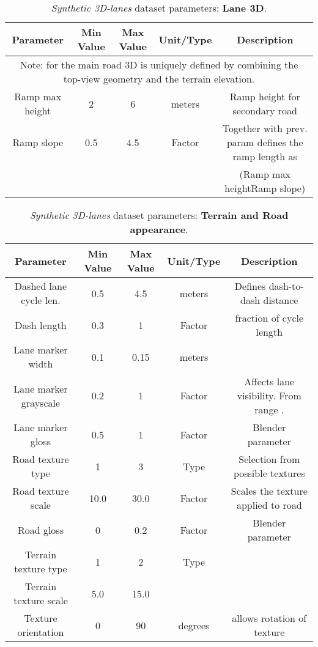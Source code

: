 \documentclass[10pt,twocolumn,letterpaper]{article}
\begin{document}
\begin{table*}[h]
	\centering
	\caption{\emph{Synthetic 3D-lanes} dataset parameters: \textbf{Lane 3D}.}
	\begin{tabular} {*5c}
		\toprule
		\textbf{Parameter} &  \textbf{Min Value} &  \textbf{Max Value} & \textbf{Unit/Type} & \textbf{Description}  \\
		\toprule
		\multicolumn{5}{c}{Note: for the main road 3D is uniquely defined by combining the top-view geometry and the terrain elevation.}	\\	
		\midrule
		Ramp max height	& 2 & 6 &	meters & Ramp height for secondary road\\
		\midrule
		Ramp slope	& 0.5 & 4.5 &	Factor & Together with prev. param defines the ramp length as \\
		& & & & (Ramp max heightRamp slope) \\
		
		\bottomrule
		
	\end{tabular} 
	\label{tab:real}
\end{table*}

\vspace{5cm}

\begin{table*}[h]
	\centering
	\caption{\emph{Synthetic 3D-lanes} dataset parameters: \textbf{Terrain and Road appearance}.}
	\begin{tabular} {*5c}
		\toprule
		\textbf{Parameter} &  \textbf{Min Value} &  \textbf{Max Value} & \textbf{Unit/Type} & \textbf{Description}  \\
		\toprule		
		Dashed lane cycle len.& 0.5 & 4.5 & meters & Defines dash-to-dash distance\\
		\midrule
		Dash length & 0.3 & 1 & Factor & fraction of cycle length\\
		\midrule
		Lane marker width & 0.1 & 0.15 & meters & \\
		\midrule
		Lane marker grayscale & 0.2 & 1 & Factor & Affects lane visibility. From range . \\
		Lane marker gloss & 0.5 & 1 & Factor & Blender parameter\\
		\midrule
		Road texture type & 1 & 3 & Type & Selection from possible textures\\
		\midrule
		Road texture scale & 10.0 & 30.0 & Factor & Scales the texture applied to road\\
		\midrule
		Road gloss & 0 & 0.2 & Factor & Blender parameter\\
		\midrule
		Terrain texture type & 1 &  2 & Type & \\
		\midrule
		Terrain texture scale  & 5.0 & 15.0 & \\
		\midrule
		Texture orientation & 0 & 90 & degrees & allows rotation of texture\\
		\bottomrule
		
	\end{tabular} 
	\label{tab:real}
\end{table*}
\end{document}
